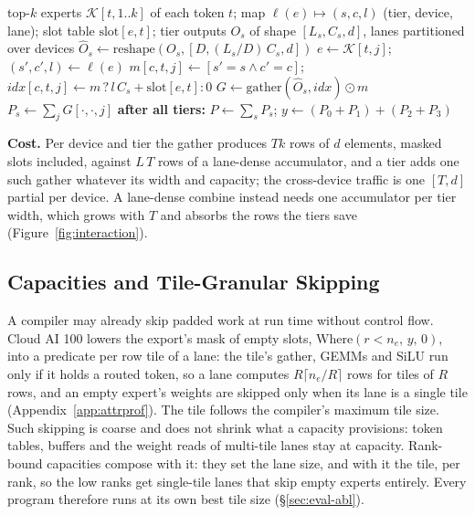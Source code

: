 \begin{algorithm}[t]
\caption{Ownership-preserving token aggregation for one tier $s$ ($D$ devices)}
\label{alg:combine}
\begin{algorithmic}[1]
\REQUIRE top-$k$ experts $\mathcal{K}[t,1..k]$ of each token $t$; map $\ell(e)\mapsto(s,c,l)$ (tier, device, lane); slot table
  $\mathrm{slot}[e,t]$; tier outputs $O_s$ of shape $[L_s,C_s,d]$, lanes partitioned over devices
\STATE $\hat O_s\leftarrow\mathrm{reshape}(O_s,[D,(L_s/D)\,C_s,d])$ 
  \STATE $e\leftarrow\mathcal{K}[t,j]$;\; $(s',c',l)\leftarrow\ell(e)$
  \STATE $m[c,t,j]\leftarrow[s'=s\wedge c'=c]$;\; $\mathit{idx}[c,t,j]\leftarrow m\,?\,l\,C_s+\mathrm{slot}[e,t]:0$
\ENDFOR
\STATE $G\leftarrow\mathrm{gather}(\hat O_s,\mathit{idx})\odot m$ 
\STATE $P_s\leftarrow\sum_j G[\cdot,\cdot,j]$ 
\STATE \textbf{after all tiers:} $P\leftarrow\sum_s P_s$;\; $y\leftarrow(P_0+P_1)+(P_2+P_3)$ 
\end{algorithmic}
\end{algorithm}

\textbf{Cost.} Per device and tier the gather produces $Tk$ rows of $d$ elements, masked slots included, against $L\,T$
rows of a lane-dense accumulator, and a tier adds one such gather whatever its width and capacity; the cross-device traffic
is one $[T,d]$ partial per device. A lane-dense combine instead needs one accumulator per tier width, which grows with $T$
and absorbs the rows the tiers save (Figure~\ref{fig:interaction}).

\subsection{Capacities and Tile-Granular Skipping}
\label{sec:skip}

A compiler may already skip padded work at run time without control flow. Cloud AI 100 lowers the export's mask of empty
slots, $\mathrm{Where}(r<n_e,\,y,\,0)$, into a predicate per row tile of a lane: the tile's gather, GEMMs and SiLU run only
if it holds a routed token, so a lane computes $R\lceil n_e/R\rceil$ rows for tiles of $R$ rows, and an empty expert's
weights are skipped only when its lane is a single tile (Appendix~\ref{app:attrprof}). The tile follows the compiler's
maximum tile size. Such skipping is coarse and does not shrink what a capacity provisions: token tables, buffers and the
weight reads of multi-tile lanes stay at capacity. Rank-bound capacities compose with it: they set the lane size, and with
it the tile, per rank, so the low ranks get single-tile lanes that skip empty experts entirely. Every program therefore
runs at its own best tile size (\S\ref{sec:eval-abl}).
